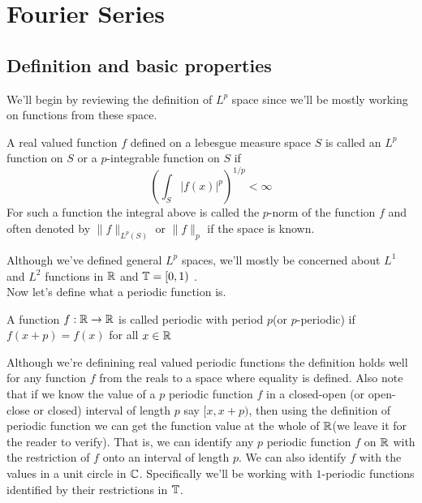 \chapter{Fourier Series}

  \section{Definition and basic properties}

    We'll begin by reviewing the definition of $L^p$ space since we'll be mostly working on functions from these space.
  \begin{definition}[$L^p$ function]
    \label{def:Lp_function}
    A real valued function $f$ defined on a lebesgue measure space $S$ is called an $L^p$ function on $S$ or a $p$-integrable function on $S$ if 
    \begin{displaymath}
       \left( \int_{S} |f(x)|^p \right)^{1/p} < \infty
    \end{displaymath}
    For such a function the integral above is called the $p$-norm of the function $f$ and often denoted by $\|f\|_{L^p(S)}$ or $\|f\|_p$ if the space is known.
\end{definition}  
  Although we've defined general $L^p$ spaces, we'll mostly be concerned about $L^1$ and $L^2$ functions in $\mathbb R$ and $\mathbb T = [0, 1)$ .
  \\

  Now let's define what a periodic function is.
  \begin{definition}
    \label{def:periodic_function}
    A function $f:\mathbb R \to \mathbb R$ is called periodic with period $p$(or $p$-periodic) if $f(x+p) = f(x)$ for all $x \in \mathbb R$

  \end{definition}
  Although we're definining real valued periodic functions the definition holds well for any function $f$ from the reals to a space where equality is defined.
  Also note that if we know the value of a $p$ periodic function $f$ in a closed-open (or open-close or closed) interval of length $p$ say $[x, x+p)$, then using the definition of periodic function we can get the function value at the whole of $\mathbb R$(we leave it for the reader to verify). That is, we can identify any $p$ periodic function $f$ on $\mathbb R$ with the restriction of $f$ onto an interval of length $p$. We can also identify $f$ with the values in a unit circle in $\mathbb C$.
  Specifically we'll be working with $1$-periodic functions identified by their restrictions in $\mathbb T$.
\\

